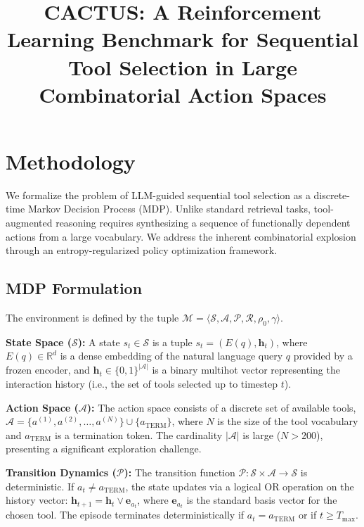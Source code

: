 \documentclass{article}
\title{CACTUS: A Reinforcement Learning Benchmark for Sequential Tool Selection in Large Combinatorial Action Spaces}
\begin{document}
\maketitle

\section{Methodology}
\label{sec:methodology}

We formalize the problem of LLM-guided sequential tool selection as a discrete-time Markov Decision Process (MDP). Unlike standard retrieval tasks, tool-augmented reasoning requires synthesizing a sequence of functionally dependent actions from a large vocabulary. We address the inherent combinatorial explosion through an entropy-regularized policy optimization framework.

\subsection{MDP Formulation}
The environment is defined by the tuple $\mathcal{M} = \langle \mathcal{S}, \mathcal{A}, \mathcal{P}, \mathcal{R}, \rho_0, \gamma \rangle$.

\textbf{State Space ($\mathcal{S}$):} 
A state $s_t \in \mathcal{S}$ is a tuple $s_t = (E(q), \mathbf{h}_t)$, where $E(q) \in \mathbb{R}^d$ is a dense embedding of the natural language query $q$ provided by a frozen encoder, and $\mathbf{h}_t \in \{0,1\}^{|\mathcal{A}|}$ is a binary multihot vector representing the interaction history (i.e., the set of tools selected up to timestep $t$). 

\textbf{Action Space ($\mathcal{A}$):} 
The action space consists of a discrete set of available tools, $\mathcal{A} = \{a^{(1)}, a^{(2)}, \dots, a^{(N)}\} \cup \{a_{\text{TERM}}\}$, where $N$ is the size of the tool vocabulary and $a_{\text{TERM}}$ is a termination token. The cardinality $|\mathcal{A}|$ is large ($N > 200$), presenting a significant exploration challenge.

\textbf{Transition Dynamics ($\mathcal{P}$):} 
The transition function $\mathcal{P}: \mathcal{S} \times \mathcal{A} \to \mathcal{S}$ is deterministic. If $a_t \neq a_{\text{TERM}}$, the state updates via a logical OR operation on the history vector: $\mathbf{h}_{t+1} = \mathbf{h}_t \vee \mathbf{e}_{a_t}$, where $\mathbf{e}_{a_t}$ is the standard basis vector for the chosen tool. The episode terminates deterministically if $a_t = a_{\text{TERM}}$ or if $t \ge T_{\max}$.
\end{document}
